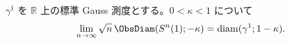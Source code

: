 $\gamma^1$ を $\mathbb{R}$ 上の標準 Gauss 測度とする。$0 < \kappa < 1$ について
\[
  \lim_{n \to \infty} \sqrt{n}\, \ObsDiam(S^n(1); -\kappa) = \operatorname{diam}(\gamma^1; 1 - \kappa).
\]
